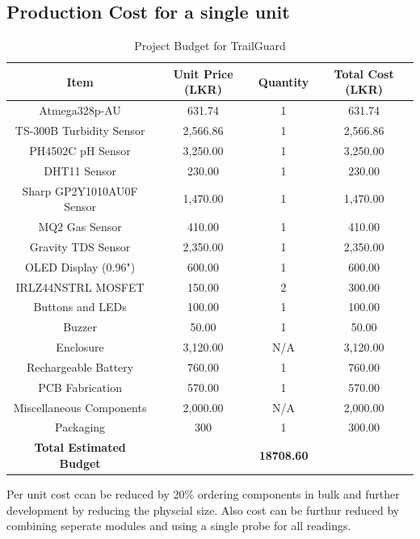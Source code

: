 \documentclass[a4paper,11pt]{article}%
\begin{document}
\subsection{Production Cost for a single unit} 
\begin{table}[h]
    \centering
    \begin{tabular}{|c|c|c|c|}
        \hline
        \textbf{Item} & \textbf{Unit Price (LKR)} & \textbf{Quantity} & \textbf{Total Cost (LKR)} \\ \hline
        Atmega328p-AU               &   631.74 & 1 &   631.74 \\ \hline
        TS-300B Turbidity Sensor    & 2,566.86 & 1 & 2,566.86\\ \hline
        PH4502C pH Sensor           & 3,250.00 & 1 & 3,250.00\\ \hline
        DHT11 Sensor                &   230.00 & 1 &   230.00\\ \hline
        Sharp GP2Y1010AU0F Sensor   & 1,470.00 & 1 & 1,470.00\\ \hline
        MQ2 Gas Sensor              &   410.00 & 1 &   410.00\\ \hline
        Gravity TDS Sensor          & 2,350.00 & 1 & 2,350.00\\ \hline
        OLED Display (0.96")        &   600.00 & 1 &   600.00\\ \hline
        IRLZ44NSTRL MOSFET          &   150.00 & 2 &   300.00 \\ \hline
        Buttons and LEDs            &   100.00 & 1 &   100.00  \\ \hline
        Buzzer                      &    50.00 & 1 &    50.00\\ \hline
        Enclosure                   & 3,120.00 & N/A & 3,120.00\\ \hline
        Rechargeable Battery        &   760.00 & 1 &    760.00 \\ \hline
        PCB Fabrication             &   570.00 & 1 &   570.00 \\ \hline
        Miscellaneous Components    & 2,000.00 & N/A & 2,000.00  \\ \hline
        Packaging                   & 300    & 1 &     300.00 \\ \hline
        \textbf{Total Estimated Budget} & \multicolumn{3}{c|}{\textbf{18708.60}} \\ \hline
    \end{tabular}
    \caption{Project Budget for TrailGuard}
    \label{table:budget}
\end{table}
Per unit cost ccan be reduced by 20\% ordering components in bulk and further development by reducing the physcial size. Also cost can be furthur reduced by combining seperate modules and using a single probe for all readings.
\newpage
\end{document}
